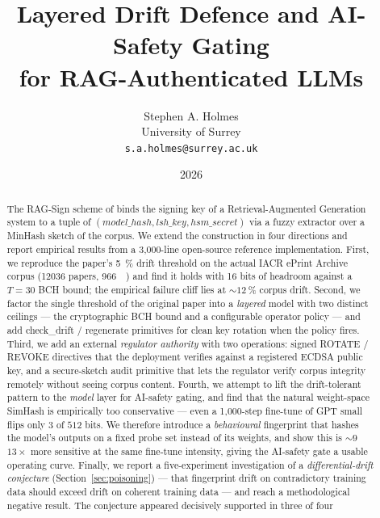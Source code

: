 \documentclass[11pt,a4paper]{article}
\title{
  Layered Drift Defence and AI-Safety Gating \\
  for RAG-Authenticated LLMs
}
\author{Stephen A. Holmes \\
  University of Surrey \\
  \texttt{s.a.holmes@surrey.ac.uk}}
\date{2026}
\begin{document}
\maketitle

\begin{abstract}
The RAG\nobreakdash-Sign scheme of \cite{holmes2025ragsign} binds the
signing key of a Retrieval\nobreakdash-Augmented Generation system
to a tuple of $(\mathit{model\_hash}, \mathit{lsh\_key},
\mathit{hsm\_secret})$ via a fuzzy extractor over a MinHash sketch
of the corpus.  We extend the construction in four directions and
report empirical results from a 3{,}000\nobreakdash-line open\nobreakdash-source
reference implementation.  First, we reproduce the paper's
\SI{5}{\percent} drift threshold on the actual IACR ePrint Archive
corpus (\num{12036} papers, \SI{966}{\mega\byte}) and find it
holds with 16 bits of headroom against a $T = 30$ BCH bound; the
empirical failure cliff lies at $\sim\!\SI{12}{\percent}$ corpus drift.
Second, we factor the single threshold of the original paper into a
\emph{layered} model with two distinct ceilings — the cryptographic
BCH bound and a configurable operator policy — and add
\textsf{check\_drift} / \textsf{regenerate} primitives for clean
key rotation when the policy fires.  Third, we add an external
\emph{regulator authority} with two operations: signed
\textsf{ROTATE} / \textsf{REVOKE} directives that the deployment
verifies against a registered ECDSA public key, and a secure\nobreakdash-sketch
audit primitive that lets the regulator verify corpus integrity
remotely without seeing corpus content.  Fourth, we attempt to lift
the drift\nobreakdash-tolerant pattern to the \emph{model} layer for
AI\nobreakdash-safety gating, and find that the natural weight\nobreakdash-space
SimHash is empirically too conservative — even a 1{,}000\nobreakdash-step
fine\nobreakdash-tune of GPT small flips only $3$ of
$512$ bits.  We therefore introduce a \emph{behavioural} fingerprint
that hashes the model's outputs on a fixed probe set instead of its
weights, and show this is ${\sim}\!9$\textendash$13\!\times$ more
sensitive at the same fine\nobreakdash-tune intensity, giving the
AI\nobreakdash-safety gate a usable operating curve.  Finally, we report
a five\nobreakdash-experiment investigation of a
\emph{differential\nobreakdash-drift conjecture}
(Section~\ref{sec:poisoning}) — that fingerprint drift on
contradictory training data should exceed drift on coherent
training data — and reach a methodological negative result.  The
conjecture appeared decisively supported in three of four

\end{abstract}
\end{document}
